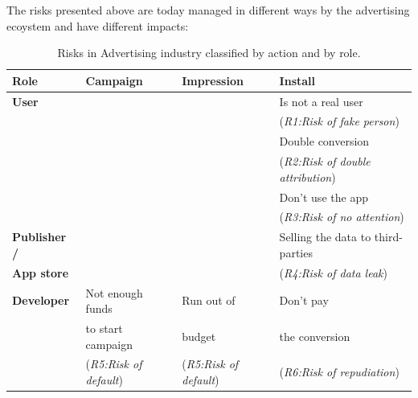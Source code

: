 
The risks presented above are today managed in different ways by the advertising ecoystem and have different impacts:

\begin{table}[ht]
\centering
\begin{tabular}{|l||l|l|l|} \hline
{\bf Role} & {\bf Campaign} & {\bf Impression}  & {\bf Install} \\ \hline
{\bf User} & & & Is not a real user \\ 
 & & & ({\em R1:Risk of fake person}) \\ 
 & & & Double conversion  \\
 & & & ({\em R2:Risk of double attribution}) \\
 & & & Don't use the app  \\
 & & & ({\em R3:Risk of no attention}) \\  \hline
{\bf Publisher  /}  & & & Selling the data to third-parties \\ 
{\bf App store} & & & ({\em R4:Risk of data leak})\\ \hline
{\bf Developer} & Not enough funds & Run out of & Don't pay \\  
 & to start campaign & budget & the conversion \\  
  & ({\em R5:Risk of default}) & ({\em R5:Risk of default}) & ({\em R6:Risk of repudiation}) \\  
\hline\end{tabular}
\caption{Risks in Advertising industry classified by action and by role.}
\label{tab:risks}
\end{table}

